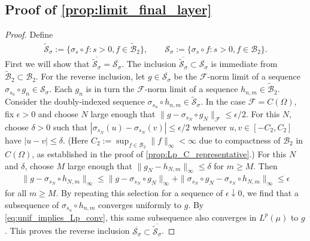 \documentclass{article}
\def\cB{{\mathcal{B}}}
\def\cF{{\mathcal{F}}}
\def\cS{{\mathcal{S}}}
\begin{document}
\begin{appendices}
\subsection{Proof of \cref{prop:limit_final_layer}} \label{appendix:proof_limit_final_layer}
\begin{proof} Define
\begin{align}
    \widetilde{\cS}_\sigma := \{ \sigma_s \circ f: s > 0, f \in \widetilde{\cB}_2 \}, \qquad \cS_\sigma := \{ \sigma_s \circ f: s > 0, f \in \cB_2 \}.
\end{align}
First we will show that $\overline{\widetilde{\cS}_\sigma} = \overline{\cS_\sigma}$. The inclusion $\overline{\widetilde{\cS}_\sigma} \subset \overline{\cS_\sigma}$ is immediate from $\widetilde{\cB}_2 \subset \cB_2$. For the reverse inclusion, let $g \in \overline{\cS_\sigma}$ be the $\cF$-norm limit of a sequence $\sigma_{s_n} \circ g_n \in \cS_\sigma$. Each $g_n$ is in turn the $\cF$-norm limit of a sequence $h_{n,m} \in \widetilde{\cB}_2$. Consider the doubly-indexed sequence $\sigma_{s_n} \circ h_{n,m} \in \widetilde{\cS}_\sigma$. In the case $\cF = C(\Omega)$, fix $\epsilon > 0$ and choose $N$ large enough that $\| g - \sigma_{s_N} \circ g_N \|_\cF \leq \epsilon/2$. For this $N$, choose $\delta > 0$ such that $|\sigma_{s_N} (u) - \sigma_{s_N} (v)| \leq \epsilon/2$ whenever $u,v \in [-C_2, C_2]$ have $|u-v| \leq \delta$. (Here $C_2 := \sup_{f \in \cB_2} \| f \|_\infty < \infty$ due to compactness of $\cB_2$ in $C(\Omega)$, as established in the proof of \cref{prop:Lp_C_representative}.) For this $N$ and $\delta$, choose $M$ large enough that $\| g_N - h_{N,m} \|_\infty\leq \delta$ for $m \geq M$. Then
\begin{align}
    \| g - \sigma_{s_N} \circ h_{N,m} \|_\infty \leq \| g - \sigma_{s_N} \circ g_N \|_\infty + \| \sigma_{s_N} \circ g_N - \sigma_{s_N} \circ h_{N,m} \|_\infty \leq \epsilon
\end{align}
for all $m \geq M$. By repeating this selection for a sequence of $\epsilon \downarrow 0$, we find that a subsequence of $\sigma_{s_n} \circ h_{n,m}$ converges uniformly to $g$. By \eqref{eq:unif_implies_Lp_conv}, this same subsequence also converges in $L^p(\mu)$ to $g$. This proves the reverse inclusion $\overline{\cS_\sigma} \subset \overline{\widetilde{\cS}_\sigma}$.


\end{proof}
\end{appendices}
\end{document}
